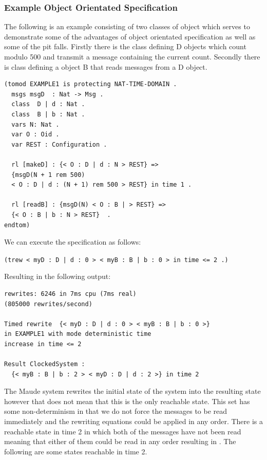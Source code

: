 \subsubsection*{Example Object Orientated Specification}
The following is an example consisting of two classes of object which serves to demonstrate some of the advantages of object orientated specification as well as some of the pit falls. Firstly there is the class defining D objects which count modulo 500 and transmit a message containing the current count. Secondly there is class defining a object B that reads messages from a D object. 

\begin{lstlisting}[caption = Example object orientated specification, label = code:rtmaudeexample]
(tomod EXAMPLE1 is protecting NAT-TIME-DOMAIN .
  msgs msgD  : Nat -> Msg .  
  class  D | d : Nat .
  class  B | b : Nat .
  vars N: Nat .
  var O : Oid .
  var REST : Configuration .
 
  rl [makeD] : {< O : D | d : N > REST} => 
  {msgD(N + 1 rem 500)  
  < O : D | d : (N + 1) rem 500 > REST} in time 1 . 

  rl [readB] : {msgD(N) < O : B | > REST} => 
  {< O : B | b : N > REST}  . 
endtom)
\end{lstlisting}

We can execute the specification as follows:
\begin{center}
\texttt{(trew {< myD : D | d : 0 > < myB : B | b : 0 >} in time <= 2 .)}
\end{center}

Resulting in the following output:
\begin{lstlisting}
rewrites: 6246 in 7ms cpu (7ms real) 
(805000 rewrites/second)

Timed rewrite  {< myD : D | d : 0 > < myB : B | b : 0 >} 
in EXAMPLE1 with mode deterministic time 
increase in time <= 2

Result ClockedSystem :
  {< myB : B | b : 2 > < myD : D | d : 2 >} in time 2
\end{lstlisting}

The Maude system rewrites the initial state of the system into the resulting state however that does not mean that this is the only reachable state. This set has some non-determinism in that we do not force the messages to be read immediately and the rewriting equations could be applied in any order. There is a reachable state in time 2 in which both of the messages have not been read meaning that either of them could be read in any order resulting in  . 
The following are some states reachable in time 2.

